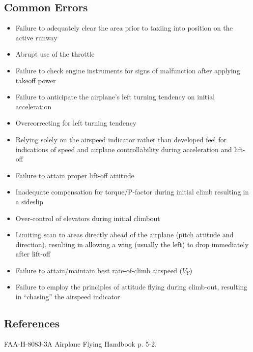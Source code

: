 \subsection{Common Errors}

\begin{itemize}
  \item Failure to adequately clear the area prior to taxiing into position on
    the active runway
  \item Abrupt use of the throttle
  \item Failure to check engine instruments for signs of malfunction after
    applying takeoff power
  \item Failure to anticipate the airplane's left turning tendency on initial
    acceleration
  \item Overcorrecting for left turning tendency
  \item Relying solely on the airspeed indicator rather than developed feel for
    indications of speed and airplane controllability during acceleration and
    lift-off
  \item Failure to attain proper lift-off attitude
  \item Inadequate compensation for torque/P-factor during initial climb
    resulting in a sideslip
  \item Over-control of elevators during initial climbout
  \item Limiting scan to areas directly ahead of the airplane (pitch attitude
    and direction), resulting in allowing a wing (usually the left) to drop
    immediately after lift-off
  \item Failure to attain/maintain best rate-of-climb airspeed ($V_Y$)
  \item Failure to employ the principles of attitude flying during climb-out,
    resulting in ``chasing'' the airspeed indicator
\end{itemize}

\subsection{References}

FAA-H-8083-3A Airplane Flying Handbook p. 5-2.
